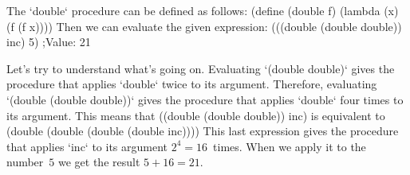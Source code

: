 The `double` procedure can be defined as follows:
\begtt\scm 
(define (double f)
  (lambda (x) (f (f x))))
\endtt
Then we can evaluate the given expression:
\begtt\scm
(((double (double double)) inc) 5)
;Value: 21
\endtt

Let's try to understand what's going on. Evaluating `(double double)` gives the procedure that applies `double` twice to its argument.  Therefore, evaluating `(double (double double))` gives the procedure that applies `double` four times to its argument.  This means that
\begtt\scm
((double (double double)) inc)
\endtt
is equivalent to
\begtt\scm
(double (double (double (double inc))))
\endtt
This last expression gives the procedure that applies `inc` to its argument $2^4=16$~times. When we apply it to the number~$5$ we get the result $5+16=21$.
